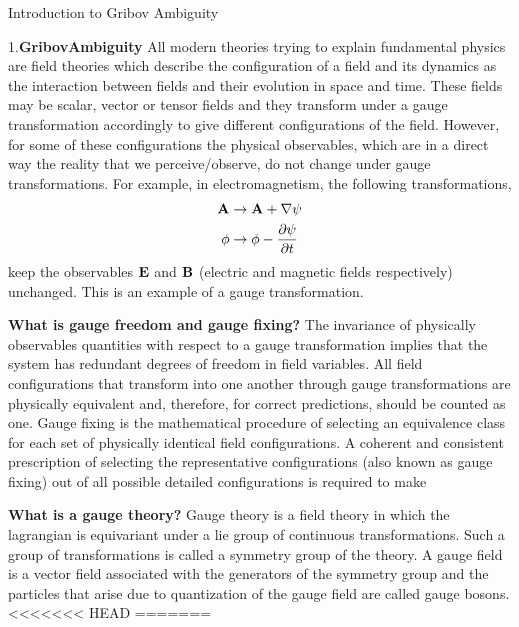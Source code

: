 \begin{description}
\begin{center}
{\large Introduction to Gribov Ambiguity}
\end{center}
1.\textbf{GribovAmbiguity}
All modern theories trying to explain fundamental physics are field theories which describe the configuration of a field and its dynamics as the interaction between fields and their evolution in space and time. These fields may be scalar, vector or tensor fields and they transform under a gauge transformation accordingly to give different configurations of the field. However, for some of these configurations the physical observables, which are in a direct way the reality that we perceive/observe, do not change under gauge transformations. For example, in electromagnetism, the following transformations,
\begin{subequations}\begin{align}
 \bold{A} &\rightarrow \bold{A} + \nabla \psi  \\
 \phi &\rightarrow \phi - \frac{\partial \psi}{\partial t}\end{align} \end{subequations}
keep the observables $\bold{E}$ and $\bold{B}$ (electric and magnetic fields respectively) unchanged. This is an example of a gauge transformation.

\textbf{What is gauge freedom and gauge fixing?}
The invariance of physically observables quantities with respect to a gauge transformation implies that the system has redundant degrees of freedom in field variables. All field configurations that transform into one another through gauge transformations are physically equivalent and, therefore, for correct predictions, should be counted as one. Gauge fixing is the mathematical procedure of selecting an equivalence class for each set of physically identical field configurations. A coherent and consistent prescription of selecting the representative configurations (also known as gauge fixing) out of all possible detailed configurations is required to make




 \textbf{What is a gauge theory?}
Gauge theory is a field theory in which the lagrangian is equivariant under a lie group of continuous transformations. Such a group of transformations is called a symmetry group of the theory. A gauge field is a vector field associated with the generators of the symmetry group and the particles that arise due to quantization of the gauge field are called gauge bosons.
<<<<<<< HEAD
=======



\end{description}
